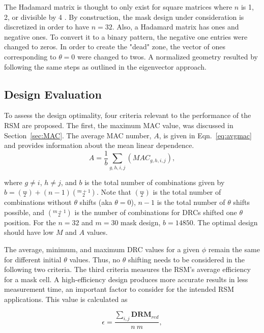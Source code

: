 \documentclass[3p,times]{elsarticle}
\begin{document}
The Hadamard matrix is thought to only exist for square matrices where $n$ is 1, 2, or divisible by 4 \cite{Sloane76}.  
By construction, the mask design under consideration is discretized in order to have $n=32$.  
Also, a Hadamard matrix has ones and negative ones.  
To convert it to a binary pattern, the negative one entries were changed to zeros.
In order to create the "dead" zone, the vector of ones corresponding to $\theta=0$ were changed to twos.  
A normalized geometry resulted by following the same steps as outlined in the eigenvector approach.

\subsection{Design Evaluation}
\label{sec:Eval}
To assess the design optimality, four criteria relevant to the performance of the RSM are proposed.  The first, the maximum MAC value, was discussed in Section~\ref{sec:MAC}.  
The average MAC number, $A$, is given in Eqn.~\ref{eq:avgmac} and provides information about the mean linear dependence.
\begin{equation}
A=\frac{1}{b}\sum_{g,h,i,j}\left(MAC_{g,h,i,j}\right),
\label{eq:avgmac}
\end{equation}

\noindent where $g\neq i$, $h\neq j$, and $b$ is the total number of combinations given by $b=\left(\overset{m}{_2}\right)+(n-1)\left(\overset{m+1}{_2}\right)$.  
Note that $\left(\overset{m}{_2}\right)$ is the total number of combinations without $\theta$ shifts (aka $\theta=0$), $n-1$ is the total number of $\theta$ shifts possible, and $\left(\overset{m+1}{_2}\right)$ is the number of combinations for DRCs shifted one $\theta$ position.  
For the $n=32$ and $m=30$ mask design, $b=14850$.  The optimal design should have low $M$ and $A$ values.

The average, minimum, and maximum DRC values for a given $\phi$ remain the same for different initial $\theta$ values.  
Thus, no $\theta$ shifting needs to be considered in the following two criteria.  The third criteria measures the RSM's average efficiency for a mask cell. 
A high-efficiency design produces more accurate results in less measurement time, an important factor to consider for the intended RSM applications.  
This value is calculated as 

\begin{equation}
\epsilon=\frac{\sum_{i,j}\mathbf{DRM}_{red}}{n\ m},
\label{eq:avgcell}
\end{equation}
\end{document}
